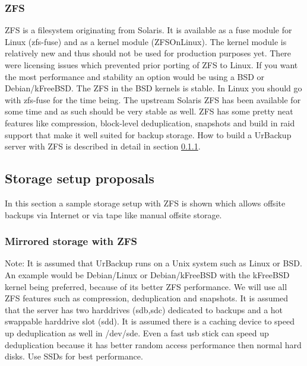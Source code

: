\documentclass[a4paper,10pt]{article}
\begin{document}
\subsubsection{ZFS}

ZFS is a filesystem originating from Solaris. It is available as a fuse module for Linux (zfs-fuse) and as a kernel module (ZFSOnLinux). The kernel module is relatively new and thus should not be used for production purposes yet. There were licensing issues which prevented prior porting of ZFS to Linux. If you want the most performance and stability an option would be using a BSD or Debian/kFreeBSD. The ZFS in the BSD kernels is stable. In Linux you should go with zfs-fuse for the time being. The upstream Solaris ZFS has been available for some time and as such should be very stable as well. ZFS has some pretty neat features like compression, block-level deduplication, snapshots and build in raid support that make it well suited for backup storage. How to build a UrBackup server with ZFS is described in detail in section \ref{subsec_ZFS_setup}.


\subsection{Storage setup proposals}
\label{sec_storage_proposals}

In this section a sample storage setup with ZFS is shown which allows offsite backups via Internet or via tape like manual offsite storage.

\subsubsection{Mirrored storage with ZFS}
\label{subsec_ZFS_setup}

Note: It is assumed that UrBackup runs on a Unix system such as Linux or BSD. An example would be Debian/Linux or Debian/kFreeBSD with the kFreeBSD kernel being preferred, because of its better ZFS performance. We will use all ZFS features such as compression, deduplication and snapshots. It is assumed that the server has two harddrives (sdb,sdc) dedicated to backups and a hot swappable harddrive slot (sdd). It is assumed there is a caching device to speed up deduplication as well in /dev/sde. Even a fast usb stick can speed up deduplication because it has better random access performance then normal hard disks. Use SSDs for best performance. 
\end{document}
